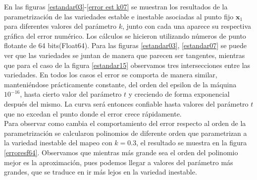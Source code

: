 En las figuras \ref{estandar03}-\ref{error est k07} se muestran los resultados de la parametrización de las variedades estable e inestable asociadas al punto fijo $\mathbf{x}_{1}$ para diferentes valores del parámetro $k$, junto con cada una aparece su respectiva gráfica del error numérico.   Los cálculos se hicieron utilizando números de punto flotante de 64 bits(Float64). Para las figuras \ref{estandar03}, \ref{estandar07} se puede ver que las variedades se juntan de manera que parecen ser tangentes, mientras que para el caso de la figura \ref{estandar15} observamos tres intersecciones entre las variedades. En todos los casos el error se comporta de manera similar, manteniéndose prácticamente constante, del orden del epsilon de la máquina $10^{-16}$, hasta cierto valor del parámetro $t$ y creciendo de forma exponencial después del mismo. La curva será entonces confiable hasta valores del parámetro $t$ que no excedan el punto donde el error crece rápidamente.  \\


Para observar como cambia el comportamiento del error respecto al orden de la parametrización se calcularon polinomios de diferente orden que parametrizan a la variedad inestable del mapeo con $k=0.3$, el resultado se muestra en la figura \ref{erroresf64}. Observamos que mientras más grande sea el orden del polinomio mejor es la aproximación, pues podemos llegar a valores del parámetro más grandes, que se traduce en ir más lejos en la variedad inestable. \\

